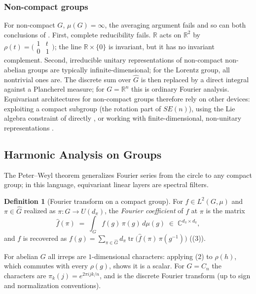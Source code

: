 \documentclass[11pt]{article}
\theoremstyle{plain}
\theoremstyle{definition}
\newtheorem{Definition}{Definition}[section]
\begin{document}
\subsubsection{Non-compact groups}
\label{subsubsec:noncompact-representations}

For non-compact $G$, $\mu(G) = \infty$, the averaging argument fails and so can both conclusions of .
First, complete reducibility fails.
$\mathbb{R}$ acts on $\mathbb{R}^2$ by $\rho(t) = \bigl(\begin{smallmatrix}1&t\\0&1\end{smallmatrix}\bigr)$; the line $\mathbb{R}\times\{0\}$ is invariant, but it has no invariant complement.
Second, irreducible unitary representations of non-compact non-abelian groups are typically infinite-dimensional; for the Lorentz group, all nontrivial ones are.
The discrete sum over $\widehat{G}$ is then replaced by a direct integral against a Plancherel measure; for $G = \mathbb{R}^n$ this is ordinary Fourier analysis.
Equivariant architectures for non-compact groups therefore rely on other devices: exploiting a compact subgroup (the rotation part of $SE(n)$), using the Lie algebra constraint of  directly \citep{finzi2021p3icml}, or working with finite-dimensional, non-unitary representations \citep{bogatskiy2020p3icml}.


\subsection{Harmonic Analysis on Groups}
\label{subsec:harmonic-analysis}

The Peter--Weyl theorem generalizes Fourier series from the circle to any compact group; in this language, equivariant linear layers are spectral filters.

\begin{Definition}[Fourier transform on a compact group]\label{def:group-fourier-transform}
For $f\in L^2(G,\mu)$ and $\pi\in\widehat{G}$ realized as $\pi: G\to U(d_\pi)$, the \emph{Fourier coefficient} of $f$ at $\pi$ is the matrix
\[
    \widehat{f}(\pi) \;=\; \int_G f(g)\,\pi(g)\,d\mu(g)\;\in\;\mathbb{C}^{d_\pi\times d_\pi},
\]
and $f$ is recovered as $f(g) = \sum_{\pi\in\widehat{G}}d_\pi\operatorname{tr}\bigl(\widehat{f}(\pi)\,\pi(g^{-1})\bigr)$ ((3)).
\end{Definition}

For abelian $G$ all irreps are $1$-dimensional characters: applying (2) to $\rho(h)$, which commutes with every $\rho(g)$, shows it is a scalar.
For $G = C_n$ the characters are $\pi_k(j) = e^{2\pi i jk/n}$, and  is the discrete Fourier transform (up to sign and normalization conventions).
\end{document}
